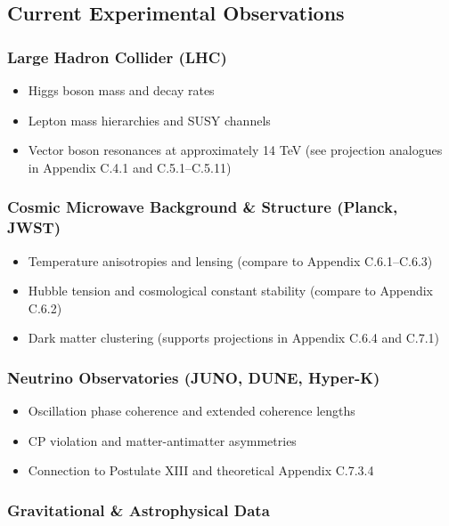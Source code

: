 \documentclass[10.5pt,a4paper]{article}
\begin{document}
\subsection{Current Experimental Observations}

\subsubsection{Large Hadron Collider (LHC)}

\begin{itemize}
  \item Higgs boson mass and decay rates
  \item Lepton mass hierarchies and SUSY channels
  \item Vector boson resonances at approximately 14 TeV (see projection analogues in Appendix C.4.1 and C.5.1--C.5.11)
\end{itemize}

\subsubsection{Cosmic Microwave Background \& Structure (Planck, JWST)}

\begin{itemize}
  \item Temperature anisotropies and lensing (compare to Appendix C.6.1--C.6.3)
  \item Hubble tension and cosmological constant stability (compare to Appendix C.6.2)
  \item Dark matter clustering (supports projections in Appendix C.6.4 and C.7.1)
\end{itemize}

\subsubsection{Neutrino Observatories (JUNO, DUNE, Hyper-K)}

\begin{itemize}
  \item Oscillation phase coherence and extended coherence lengths
  \item CP violation and matter-antimatter asymmetries
  \item Connection to Postulate XIII and theoretical Appendix C.7.3.4
\end{itemize}

\subsubsection{Gravitational \& Astrophysical Data}
\end{document}
